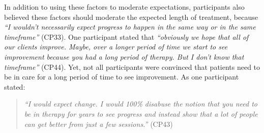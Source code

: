 In addition to using these factors to moderate expectations, participants also believed these factors should moderate the expected length of treatment, because \textit{``I wouldn't necessarily expect progress to happen in the same way or in the same timeframe''} (CP33).
One participant stated that \textit{``obviously we hope that all of our clients improve. Maybe, over a longer period of time we start to see improvement because you had a long period of therapy. But I don't know that timeframe''} (CP44).
Yet, not all participants were convinced that patients need to be in care for a long period of time to see improvement.
As one participant stated:

\begin{quote}
    \textit{``I would expect change. I would 100\% disabuse the notion that you need to be in therapy for years to see progress and instead show that a lot of people can get better from just a few sessions.''} (CP43)
\end{quote}



